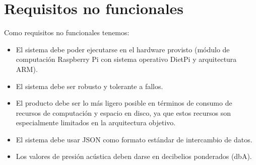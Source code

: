 \section{Requisitos no funcionales} \label{sec:rnf}

Como requisitos no funcionales tenemos:

\begin{itemize}
    \item El sistema debe poder ejecutarse en el hardware provisto (módulo de computación Raspberry Pi con sistema operativo DietPi y arquitectura \acrshort{ARM}).

    \item El sistema debe ser robusto y tolerante a fallos.

    \item El producto debe ser lo más ligero posible en términos de consumo de recursos de computación y espacio en disco, ya que estos recursos son especialmente limitados en la arquitectura objetivo.

    \item El sistema debe usar \acrshort{JSON} como formato estándar de intercambio de datos.

    \item Los valores de presión acústica deben darse en decibelios ponderados (dbA).
\end{itemize}



